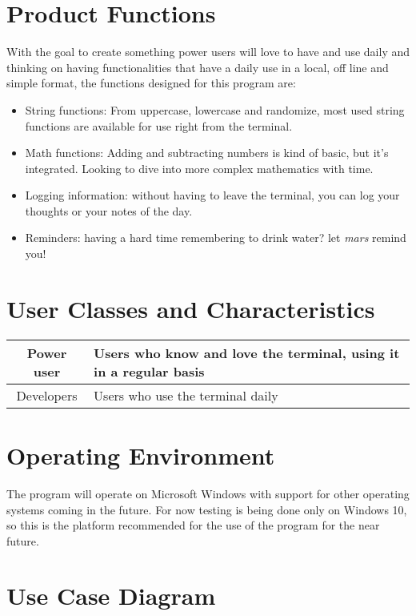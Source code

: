 \documentclass{report}
\begin{document}
\section{Product Functions}
With the goal to create something power users will love to have and use daily and thinking on having functionalities that have a daily use in a local, off line and simple format, the functions designed for this program are:
\begin{itemize}
\item{String functions: From uppercase, lowercase and randomize, most used string functions are available for use right from the terminal.}
\item{Math functions: Adding and subtracting numbers is kind of basic, but it's integrated. Looking to dive into more complex mathematics with time.}
\item{Logging information: without having to leave the terminal, you can log your thoughts or your notes of the day.}
\item{Reminders: having a hard time remembering to drink water? let \emph{mars} remind you!}
\end{itemize}

\section{User Classes and Characteristics}
\begin{center}
\begin{tabular}{|| c | p{7cm} ||}
\hline
Power user & Users who know and love the terminal, using it in a regular basis \\
\hline
Developers & Users who use the terminal daily \\
\hline
\end{tabular}
\end{center}

\section{Operating Environment}
The program will operate on Microsoft Windows with support for other operating systems coming in the future. For now testing is being done only on Windows 10, so this is the platform recommended for the use of the program for the near future.

\section{Use Case Diagram}
\end{document}
